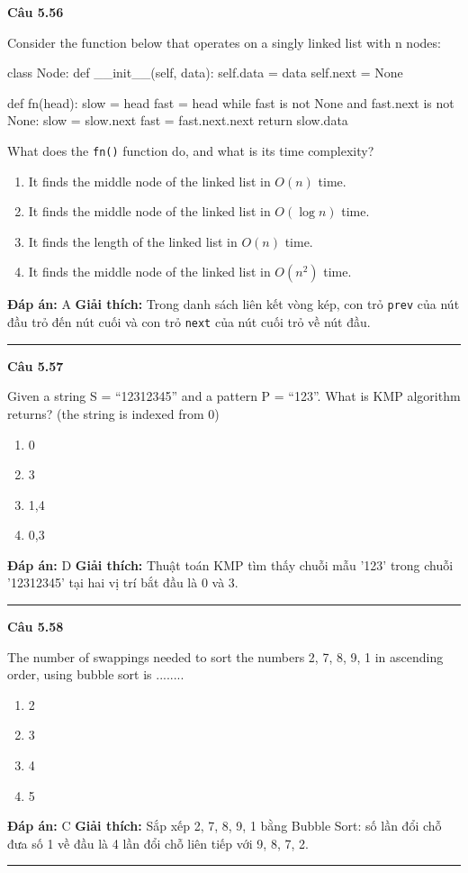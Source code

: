 \documentclass[11pt,a4paper]{article}
\newenvironment{question}[1]{%
  \par\vspace{1em}\noindent\textbf{\large Câu #1}\par\vspace{0.4em}
}{%
  \par\vspace{1em}\hrule\vspace{0.6em}
}
\newenvironment{choices}{%
  \begin{enumerate}[label=\textbf{\Alph*.},leftmargin=2.2em,itemsep=2pt,topsep=3pt]
}{%
  \end{enumerate}
}
\newcommand{\choice}{\item}
\newenvironment{codebox}{%
  \begin{tcolorbox}[colback=gray!8!white,colframe=gray!50!black,arc=1.5mm,boxrule=0.6pt,left=3mm,right=3mm,top=2.5mm,bottom=2.5mm]
  \ttfamily\small
}{%
  \end{tcolorbox}
}
\begin{document}
\begin{question}{5.56}
Consider the function below that operates on a singly linked list with n nodes:
\begin{codebox}
class Node:
    def __init__(self, data):
        self.data = data
        self.next = None

def fn(head):
    slow = head
    fast = head
    while fast is not None and fast.next is not None:
        slow = slow.next
        fast = fast.next.next
    return slow.data
\end{codebox}
What does the \texttt{fn()} function do, and what is its time complexity?
\begin{choices}
\choice It finds the middle node of the linked list in $O(n)$ time.
\choice It finds the middle node of the linked list in $O(\log n)$ time.
\choice It finds the length of the linked list in $O(n)$ time.
\choice It finds the middle node of the linked list in $O(n^2)$ time.
\end{choices}
\textbf{Đáp án:} A
\textbf{Giải thích:} Trong danh sách liên kết vòng kép, con trỏ \texttt{prev} của nút đầu trỏ đến nút cuối và con trỏ \texttt{next} của nút cuối trỏ về nút đầu.
\end{question}

\begin{question}{5.57}
Given a string S = ``12312345'' and a pattern P = ``123''. What is KMP algorithm returns? (the string is indexed from 0)
\begin{choices}
\choice 0
\choice 3
\choice 1,4
\choice 0,3
\end{choices}
\textbf{Đáp án:} D
\textbf{Giải thích:} Thuật toán KMP tìm thấy chuỗi mẫu '123' trong chuỗi '12312345' tại hai vị trí bắt đầu là 0 và 3.
\end{question}

\begin{question}{5.58}
The number of swappings needed to sort the numbers 2, 7, 8, 9, 1 in ascending order, using bubble sort is ........
\begin{choices}
\choice 2
\choice 3
\choice 4
\choice 5
\end{choices}
\textbf{Đáp án:} C
\textbf{Giải thích:} Sắp xếp 2, 7, 8, 9, 1 bằng Bubble Sort: số lần đổi chỗ đưa số 1 về đầu là 4 lần đổi chỗ liên tiếp với 9, 8, 7, 2.
\end{question}
\end{document}
